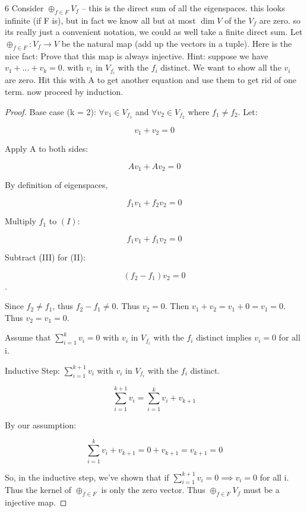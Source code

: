 \documentclass{article}
\newcommand{\rarr}[0]{\rightarrow}
\begin{document}
\begin{PROB}{6}\label{Problem 6.}
    Consider $\oplus_{ f \in F} V_f$ -- this is the direct sum of all the eigenspaces. this looks infinite (if F is), but in fact we know all but at most $\dim V$ of the $V_f$ are zero. so its really just a convenient notation, we could as well take a finite direct sum.  Let $\oplus_{f \in F}: V_f \rarr V$ be the natural map (add up the vectors in a tuple). Here is the nice fact: Prove that this map is always injective.  Hint: suppose we have $v_1 + ... + v_k = 0$. with $v_i$ in $V_{f_i}$ with the $f_i$ distinct.  We want to show all the $v_i$ are zero. Hit this with A to get another equation and use them to get rid of one term. now proceed by induction.
\end{PROB}
\begin{proof}
    Base case (k = 2): $\forall v_1 \in V_{f_1}$ and $\forall v_2 \in V_{f_2}$ where $f_1 \neq f_2$. 
    Let: 
    
    \begin{equation}{}
        v_1 + v_2 = 0
    \end{equation}

    Apply A to both sides:

    $$Av_1 + Av_2 = 0$$

    By definition of eigenspaces,

    \begin{equation}{}
        f_1v_1 + f_2v_2 = 0
    \end{equation}

    Multiply $f_1$ to $(I)$:

    \begin{equation}{}
        f_1v_1 + f_1v_2 = 0
    \end{equation}

    Subtract (III) for (II):

    \begin{equation}{}
        (f_2 - f_1)v_2 = 0
    \end{equation}.

    Since $f_2 \neq f_1$, thus $f_2 - f_1 \neq 0$. Thus $v_2 = 0$. Then $v_1 + v_2 = v_1 + 0 = v_1 = 0$. Thus $v_2 = v_1 = 0$.

    Assume that $\sum_{i=1}^{k}v_i = 0$ with $v_i$ in $V_{f_i}$ with the $f_i$ distinct implies $v_i = 0$ for all i.

    Inductive Step: $\sum_{i=1}^{k + 1}v_i$ with $v_i$ in $V_{f_i}$ with the $f_i$ distinct.

    $$\sum_{i=1}^{k + 1}v_i = \sum_{i=1}^{k}v_i + v_{k+1}$$

    By our assumption:

    $$\sum_{i=1}^{k}v_i + v_{k+1} = 0 + v_{k+1} = v_{k+1} = 0$$

    So, in the inductive step, we've shown that if $\sum_{i=1}^{k + 1}v_i = 0 \implies v_i = 0$ for all i. Thus the kernel of $\oplus_{ f \in F}$ is only the zero vector. Thus $\oplus_{ f \in F} V_f$ must be a injective map.
\end{proof}
\end{document}
